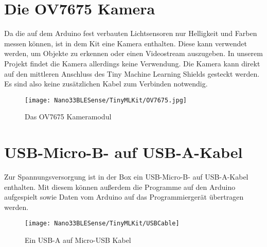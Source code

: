\section{Die OV7675 Kamera}

Da die auf dem Arduino fest verbauten Lichtsensoren nur Helligkeit und Farben messen können, ist in dem Kit eine Kamera enthalten. Diese kann verwendet werden, um Objekte zu erkennen oder einen Videostream auszugeben. In unserem Projekt findet die Kamera allerdings keine Verwendung.\newline
Die Kamera kann direkt auf den mittleren Anschluss des Tiny Machine Learning Shields gesteckt werden. Es sind also keine zusätzlichen Kabel zum Verbinden notwendig. 

\begin{figure}[H]
    \centering
    \texttt{[image: Nano33BLESense/TinyMLKit/OV7675.jpg]}
    \caption[Das OV7675 Kameramodul]{Das OV7675 Kameramodul \cite{ArduinoKit:2022}}
\end{figure}


\section{USB-Micro-B- auf USB-A-Kabel}

Zur Spannungsversorgung ist in der Box ein USB-Micro-B- auf USB-A-Kabel enthalten. Mit diesem können außerdem die Programme auf den Arduino aufgespielt sowie Daten vom Arduino auf das Programmiergerät übertragen werden.

\begin{figure}[H]
    \centering
    \texttt{[image: Nano33BLESense/TinyMLKit/USBCable]}
    \caption{Ein USB-A auf Micro-USB Kabel}
\end{figure}


